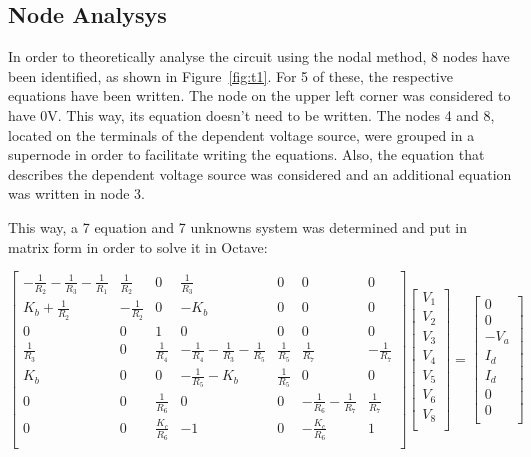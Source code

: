 \subsection{Node Analysys}

In order to theoretically analyse the circuit using the nodal method, 
8 nodes have been identified, as shown in Figure~\ref{fig:t1}. For 5 of these, the respective equations have been written. 
The node on the upper left corner was considered to have 0V. 
This way, its equation doesn't need to be written. 
The nodes 4 and 8, located on the terminals of the dependent voltage source, were grouped in a supernode in order to facilitate writing the equations. 
Also, the equation that describes the dependent voltage source was considered and an additional equation was written in node 3.

This way, a 7 equation and 7 unknowns system was determined and put in matrix form in order to solve it in Octave: \vspace{4mm}

$
\begin{bmatrix}
   -\frac{1}{R_2}-\frac{1}{R_3}-\frac{1}{R_1} & \frac{1}{R_2} & 0 & \frac{1}{R_3} & 0 & 0 & 0 \\
   K_b+\frac{1}{R_2} & -\frac{1}{R_2} & 0 & -K_b & 0 & 0 & 0 \\ 
   0 & 0 & 1 & 0 & 0 & 0 & 0 \\
   \frac{1}{R_3} & 0 & \frac{1}{R_4} & -\frac{1}{R_4}-\frac{1}{R_3}-\frac{1}{R_5} &  \frac{1}{R_5} & \frac{1}{R_7} & -\frac{1}{R_7} \\
   K_b & 0 & 0 & -\frac{1}{R_5}-K_b & \frac{1}{R_5} & 0 & 0 \\
   0 & 0 &\frac{1}{R_6} & 0 & 0 & -\frac{1}{R_6}-\frac{1}{R_7} & \frac{1}{R_7} \\
   0 & 0 & \frac{K_c}{R_6} & -1 & 0 & -\frac{K_c}{R_6} & 1 \\
\end{bmatrix}
\begin{bmatrix}
   V_1 \\
   V_2 \\
   V_3 \\
   V_4 \\
   V_5 \\
   V_6 \\
   V_8 \\
\end{bmatrix}
=
\begin{bmatrix}
   0 \\
   0 \\
   -V_a \\ 
   I_d \\
   I_d \\
   0 \\
   0 \\
\end{bmatrix}
$
\vspace{5mm}

